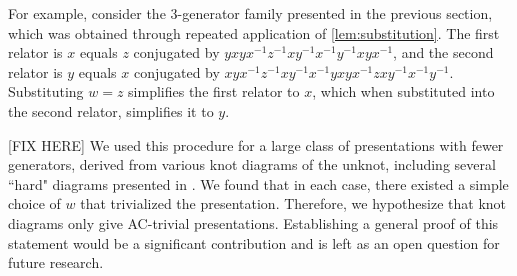 For example, consider the 3-generator family presented in the previous section, which was obtained through repeated application of \cref{lem:substitution}. The first relator is $x$ equals $z$ conjugated by  $yxyx^{-1}z^{-1}xy^{-1}x^{-1}y^{-1}xyx^{-1}$, and the second relator is $y$ equals $x$ conjugated by $xyx^{-1}z^{-1}xy^{-1}x^{-1}yxyx^{-1}zxy^{-1}x^{-1}y^{-1}$. Substituting $w=z$ simplifies the first relator to $x$, which when substituted into the second relator, simplifies it to $y$. 

[FIX HERE] We used this procedure for a large class of presentations with fewer generators, derived from various knot diagrams of the unknot, including several ``hard" diagrams presented in \cite{burton2024hard}. We found that in each case, there existed a simple choice of $w$ that trivialized the presentation. Therefore, we hypothesize that knot diagrams only give AC-trivial presentations. Establishing a general proof of this statement would be a significant contribution and is left as an open question for future research.




